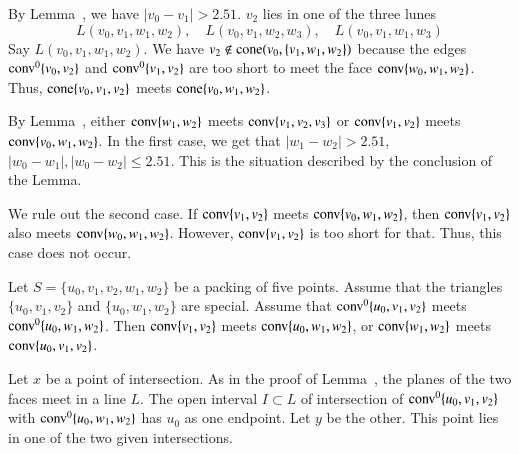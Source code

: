 \begin{tarskidata}
\begin{tarski}
\begin{proved}
By Lemma~, we have $|v_0-v_1|>2.51$.  
$v_2$ lies in one of the three lunes
$$L(v_0,v_1,w_1,w_2),\quad L(v_0,v_1,w_2,w_3),\quad L(v_0,v_1,w_1,w_3)$$
Say $L(v_0,v_1,w_1,w_2)$.   We have $v_2\not\in{\operatorname{cone}}(v_0,\{v_1,w_1,w_2\})$
because the edges ${\operatorname{conv}}^0\{v_0,v_2\}$ 
and ${\operatorname{conv}}^0\{v_1,v_2\}$ are too short to meet
the face ${\operatorname{conv}}\{w_0,w_1,w_2\}$.  Thus, ${\operatorname{cone}}\{v_0,v_1,v_2\}$ meets
${\operatorname{cone}}\{v_0,w_1,w_2\}$.

By Lemma~,
either ${\operatorname{conv}}\{w_1,w_2\}$ meets ${\operatorname{conv}}\{v_1,v_2,v_3\}$ or
${\operatorname{conv}}\{v_1,v_2\}$ meets ${\operatorname{conv}}\{v_0,w_1,w_2\}$.
In the first case, we get that $|w_1-w_2|>2.51$, $|w_0-w_1|,|w_0-w_2|\le 2.51$.
This is the situation described by the conclusion of the Lemma.

We rule out the second case.  If 
${\operatorname{conv}}\{v_1,v_2\}$ meets ${\operatorname{conv}}\{v_0,w_1,w_2\}$,
then ${\operatorname{conv}}\{v_1,v_2\}$ also meets ${\operatorname{conv}}\{w_0,w_1,w_2\}$.
However, ${\operatorname{conv}}\{v_1,v_2\}$ is too short for that.  Thus,
this case does not occur.
\swallowed\end{proved}
\end{tarski}





\begin{tarski}

\begin{lemma}
Let $S=\{u_0,v_1,v_2,w_1,w_2\}$ be a packing of five points.
Assume that the triangles $\{u_0,v_1,v_2\}$ and $\{u_0,w_1,w_2\}$ are
special.
Assume that ${\operatorname{conv}}^0\{u_0,v_1,v_2\}$ meets
${\operatorname{conv}}^0\{u_0,w_1,w_2\}$.  Then
${\operatorname{conv}}\{v_1,v_2\}$ meets ${\operatorname{conv}}\{u_0,w_1,w_2\}$, or
${\operatorname{conv}}\{w_1,w_2\}$ meets ${\operatorname{conv}}\{u_0,v_1,v_2\}$.
\end{lemma}

\begin{proved}
Let $x$ be a point of intersection.  As in the proof of 
Lemma~, the planes of the two faces
meet in a line $L$.  The open interval $I\subset L$ of intersection of
${\operatorname{conv}}^0\{u_0,v_1,v_2\}$ with ${\operatorname{conv}}^0\{u_0,w_1,w_2\}$ has
$u_0$ as one endpoint.  Let $y$ be the other.  This point lies
in one of the two given intersections.
\swallowed\end{proved}
\end{tarski}







\end{tarskidata}
